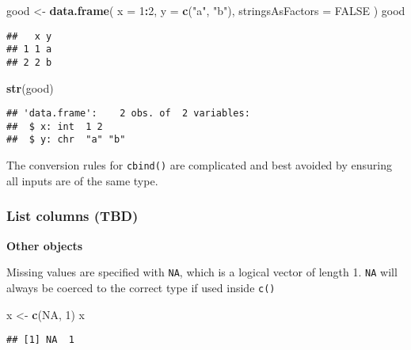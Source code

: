 \documentclass[
]{book}
\newenvironment{Shaded}{\begin{snugshade}}{\end{snugshade}}
\newcommand{\DataTypeTok}[1]{\textcolor[rgb]{0.13,0.29,0.53}{#1}}
\newcommand{\DecValTok}[1]{\textcolor[rgb]{0.00,0.00,0.81}{#1}}
\newcommand{\KeywordTok}[1]{\textcolor[rgb]{0.13,0.29,0.53}{\textbf{#1}}}
\newcommand{\NormalTok}[1]{#1}
\newcommand{\OperatorTok}[1]{\textcolor[rgb]{0.81,0.36,0.00}{\textbf{#1}}}
\newcommand{\OtherTok}[1]{\textcolor[rgb]{0.56,0.35,0.01}{#1}}
\newcommand{\StringTok}[1]{\textcolor[rgb]{0.31,0.60,0.02}{#1}}
\begin{document}
\begin{Shaded}
\begin{Highlighting}[]
\NormalTok{good \textless{}{-}}\StringTok{ }\KeywordTok{data.frame}\NormalTok{(}
  \DataTypeTok{x =} \DecValTok{1}\OperatorTok{:}\DecValTok{2}\NormalTok{, }\DataTypeTok{y =} \KeywordTok{c}\NormalTok{(}\StringTok{"a"}\NormalTok{, }\StringTok{"b"}\NormalTok{),}
  \DataTypeTok{stringsAsFactors =} \OtherTok{FALSE}
\NormalTok{)}
\NormalTok{good}
\end{Highlighting}
\end{Shaded}

\begin{verbatim}
##   x y
## 1 1 a
## 2 2 b
\end{verbatim}

\begin{Shaded}
\begin{Highlighting}[]
\KeywordTok{str}\NormalTok{(good)}
\end{Highlighting}
\end{Shaded}

\begin{verbatim}
## 'data.frame':    2 obs. of  2 variables:
##  $ x: int  1 2
##  $ y: chr  "a" "b"
\end{verbatim}

The conversion rules for \texttt{cbind()} are complicated and best avoided by ensuring all inputs are of the same type.

\hypertarget{list-columns-tbd}{%
\subsubsection{List columns (TBD)}\label{list-columns-tbd}}

\textbf{Other objects}

Missing values are specified with \texttt{NA}, which is a logical vector of length 1. \texttt{NA} will always be coerced to the correct type if used inside \texttt{c()}

\begin{Shaded}
\begin{Highlighting}[]
\NormalTok{x \textless{}{-}}\StringTok{ }\KeywordTok{c}\NormalTok{(}\OtherTok{NA}\NormalTok{, }\DecValTok{1}\NormalTok{)}
\NormalTok{x}
\end{Highlighting}
\end{Shaded}

\begin{verbatim}
## [1] NA  1
\end{verbatim}
\end{document}
